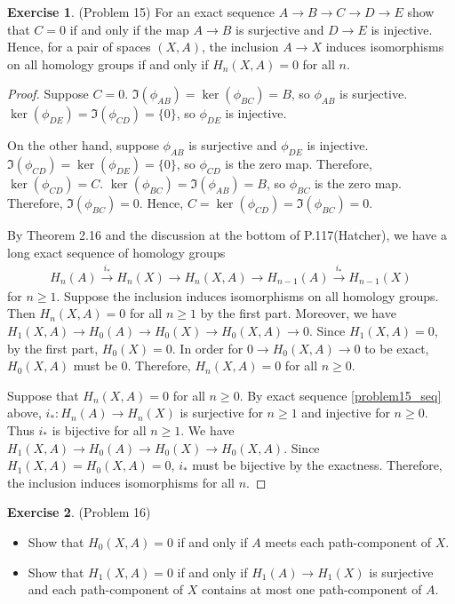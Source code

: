 \documentclass[12pt, psamsfonts]{amsart}
\theoremstyle{definition}
\newtheorem*{exer}{Exercise}
\theoremstyle{remark}
\numberwithin{equation}{section}
\begin{document}
\begin{exer}{(Problem 15)}
  For an exact sequence $A \rightarrow B \rightarrow C \rightarrow D \rightarrow E$ show that $C = 0$ if and only if the map $A \rightarrow B$ is surjective and $D \rightarrow E$ is injective.
  Hence, for a pair of spaces $(X, A)$, the inclusion $A \rightarrow X$ induces isomorphisms on all homology groups if and only if $H_n(X, A) = 0$ for all $n$.
\end{exer}

\begin{proof}
  Suppose $C = 0$.
  $\Im(\phi_{AB}) = \ker(\phi_{BC}) = B$, so $\phi_{AB}$ is surjective.
  $\ker(\phi_{DE}) = \Im(\phi_{CD}) = \{ 0 \}$, so $\phi_{DE}$ is injective.

  On the other hand, suppose $\phi_{AB}$ is surjective and $\phi_{DE}$ is injective.
  $\Im(\phi_{CD}) = \ker(\phi_{DE}) = \{ 0 \}$, so $\phi_{CD}$ is the zero map.
  Therefore, $\ker(\phi_{CD}) = C$.
  $\ker(\phi_{BC}) = \Im(\phi_{AB}) = B$, so $\phi_{BC}$ is the zero map.
  Therefore, $\Im(\phi_{BC}) = 0$.
  Hence, $C = \ker(\phi_{CD}) = \Im(\phi_{BC}) = 0$.

  By Theorem 2.16 and the discussion at the bottom of P.117(Hatcher), we have a long exact sequence of homology groups
  \begin{align} \label{problem15_seq}
    H_n(A) \xrightarrow{i_*} H_n(X) \rightarrow H_n(X, A) \rightarrow H_{n - 1}(A) \xrightarrow{i_*} H_{n - 1}(X)
  \end{align}
  for $n \geq 1$.
  Suppose the inclusion induces isomorphisms on all homology groups.
  Then $H_n(X, A) = 0$ for all $n \geq 1$ by the first part.
  Moreover, we have $H_1(X, A) \rightarrow H_0(A) \rightarrow H_0(X) \rightarrow H_0(X, A) \rightarrow 0$.
  Since $H_1(X, A) = 0$, by the first part, $H_0(X) = 0$.
  In order for $0 \rightarrow H_0(X, A) \rightarrow 0$ to be exact, $H_0(X, A)$ must be 0.
  Therefore, $H_n(X, A) = 0$ for all $n \geq 0$.

  Suppose that $H_n(X, A) = 0$ for all $n \geq 0$.
  By exact sequence \ref{problem15_seq} above, $i_*: H_n(A) \rightarrow H_n(X)$ is surjective for $n \geq 1$ and injective for $n \geq 0$.
  Thus $i_*$ is bijective for all $n \geq 1$.
  We have $H_1(X, A) \rightarrow H_0(A) \rightarrow H_0(X) \rightarrow H_0(X, A)$.
  Since $H_1(X, A) = H_0(X, A) = 0$, $i_*$ must be bijective by the exactness.
  Therefore, the inclusion induces isomorphisms for all $n$.
\end{proof}

\begin{exer}{(Problem 16)}
  \begin{itemize}
    \item
      Show that $H_0(X, A) = 0$ if and only if $A$ meets each path-component of $X$.
    \item
      Show that $H_1(X, A) = 0$ if and only if $H_1(A) \rightarrow H_1(X)$ is surjective and each path-component of $X$ contains at most one path-component of $A$.
  \end{itemize}
\end{exer}
\end{document}
